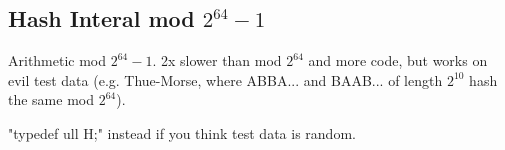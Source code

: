 \subsection{Hash Interal mod $2^{64}-1$}

Arithmetic mod $2^{64}-1$. 2x slower than mod $2^{64}$ and more code, but works on evil test data (e.g. Thue-Morse, where ABBA... and BAAB... of length $2^{10}$ hash the same mod $2^{64}$).

"typedef ull H;" instead if you think test data is random.

